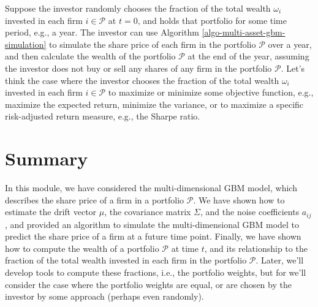 \documentclass[11pt]{article}
\theoremstyle{definition}
\begin{document}
Suppose the investor randomly chooses the fraction of the total wealth $\omega_{i}$ invested in each firm $i\in\mathcal{P}$ 
at $t=0$, and holds that portfolio for some time period, e.g., a year. 
The investor can use Algorithm \ref{algo-multi-asset-gbm-simulation} 
to simulate the share price of each firm in the portfolio $\mathcal{P}$ over a year, and then calculate 
the wealth of the portfolio $\mathcal{P}$ at the end of the year, assuming the investor
does not buy or sell any shares of any firm in the portfolio $\mathcal{P}$. Let's think the case where the investor chooses the fraction of the total wealth $\omega_{i}$ invested in each firm $i\in\mathcal{P}$ 
to maximize or minimize some objective function, e.g., maximize the expected return, minimize the variance, 
or to maximize a specific risk-adjusted return measure, e.g., the Sharpe ratio.


\section*{Summary}
In this module, we have considered the multi-dimensional GBM model, 
which describes the share price of a firm in a portfolio $\mathcal{P}$.
We have shown how to estimate the drift vector $\mu$, the covariance matrix $\Sigma$, and the noise coefficients $a_{ij}$,
and provided an algorithm to simulate the multi-dimensional GBM model to predict the share price of a firm at a future time point.
Finally, we have shown how to compute the wealth of a portfolio $\mathcal{P}$ at time $t$, and its relationship 
to the fraction of the total wealth invested in each firm in the portfolio $\mathcal{P}$.
Later, we'll develop tools to compute these fractions, i.e., the portfolio weights, 
but for we'll consider the case where the portfolio weights are equal, or are chosen by the investor by some approach
(perhaps even randomly).



\clearpage
\printindex
\end{document}
